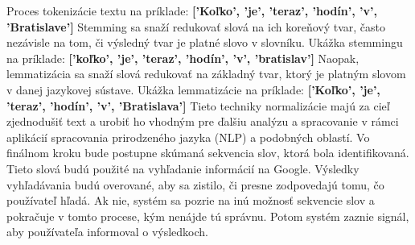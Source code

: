 \documentclass[10pt,slovak,a4paper]{article}
\begin{document}
\begin{enumerate}
\leavevmode \newline
\leavevmode \newline
Proces tokenizácie textu na príklade:
\leavevmode \newline
\textbf{['Koľko', 'je', 'teraz', 'hodín', 'v', 'Bratislave']}
\leavevmode \newline
\leavevmode \newline
Stemming sa snaží redukovať slová na ich koreňový tvar, často nezávisle na tom, či výsledný tvar je platné slovo v slovníku.
\leavevmode \newline
Ukážka stemmingu na príklade:
\leavevmode \newline
\textbf{['koľko', 'je', 'teraz', 'hodín', 'v', 'bratislav']}
\leavevmode \newline
\leavevmode \newline
Naopak, lemmatizácia sa snaží slová redukovať na základný tvar, ktorý je platným slovom v danej jazykovej sústave.
\leavevmode \newline
Ukážka lemmatizácie na príklade:
\leavevmode \newline
\textbf{['Koľko', 'je', 'teraz', 'hodín', 'v', 'Bratislava']}
\leavevmode \newline
\leavevmode \newline
Tieto techniky normalizácie majú za cieľ zjednodušiť text a urobiť ho vhodným pre ďalšiu analýzu a spracovanie v rámci aplikácií spracovania prirodzeného jazyka (NLP) a podobných oblastí.\cite{lopezyse2021}
\leavevmode \newline
\leavevmode \newline
Vo finálnom kroku bude postupne skúmaná sekvencia slov, ktorá bola identifikovaná. Tieto slová budú použité na vyhľadanie informácií na Google. Výsledky vyhľadávania budú overované, aby sa zistilo, či presne zodpovedajú tomu, čo používateľ hľadá. Ak nie, systém sa pozrie na inú možnosť sekvencie slov a pokračuje v tomto procese, kým nenájde tú správnu. Potom systém zaznie signál, aby používateľa informoval o výsledkoch.
\cite{schalkwyk2010your}


\end{enumerate}
\end{document}
